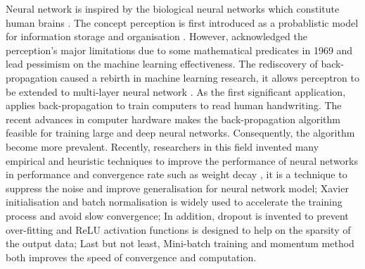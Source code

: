 
Neural network is inspired by the biological neural networks which constitute human brains \citep{10.2307/4299364}.
The concept perception is first introduced as a probablistic model for information storage and organisation \citep{rosenblatt}.
However, \citet{minsky69perceptrons} acknowledged the perception's major limitations due to some mathematical predicates in 1969 and lead pessimism on the machine learning effectiveness.
The rediscovery of back-propagation caused a rebirth in machine learning research, it allows perceptron to be extended to multi-layer neural network \citep{58337}. As the first significant application, \citet{NIPS1989293} applies back-propagation to train computers to read human handwriting. The recent advances in computer hardware makes the back-propagation algorithm feasible for training large and deep neural networks. Consequently, the algorithm become more prevalent. Recently, researchers in this field invented many empirical and heuristic techniques to improve the performance of neural networks in performance and convergence rate such as weight decay \citet{NIPS1991563}, it is a technique to suppress the noise and improve generalisation for neural network model;
Xavier initialisation \citet{pmlr-v9-glorot10a} and batch normalisation \citet{pmlr-v37-ioffe15} is widely used to accelerate the training process and avoid slow convergence;
In addition, dropout \citet{DBLP:journals/corr/abs-1207-0580} is invented to prevent over-fitting and ReLU activation functions \citet{relu-hahnloser} is designed to help on the sparsity of the output data;
Last but not least, Mini-batch training \citet{DBLP:journals/corr/GoyalDGNWKTJH17} and momentum method \citet{rumelhart1986learning} both improves the speed of convergence and computation.


